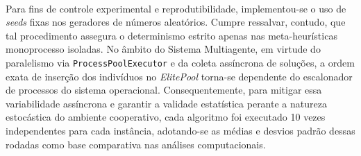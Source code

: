 \paragraph{} Para fins de controle experimental e reprodutibilidade, implementou-se o uso de \textit{seeds} fixas nos geradores de números aleatórios. Cumpre ressalvar, contudo, que tal procedimento assegura o determinismo estrito apenas nas meta-heurísticas monoprocesso isoladas. No âmbito do Sistema Multiagente, em virtude do paralelismo via \texttt{ProcessPoolExecutor} e da coleta assíncrona de soluções, a ordem exata de inserção dos indivíduos no \textit{ElitePool} torna-se dependente do escalonador de processos do sistema operacional. Consequentemente, para mitigar essa variabilidade assíncrona e garantir a validade estatística perante a natureza estocástica do ambiente cooperativo, cada algoritmo foi executado 10 vezes independentes para cada instância, adotando-se as médias e desvios padrão dessas rodadas como base comparativa nas análises computacionais.

